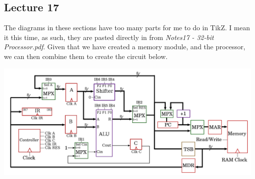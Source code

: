 \documentclass[a4paper, 12pt]{article}
\begin{document}
        \subsection*{Lecture 17}
            The diagrams in these sections have too many parts for me to do in TikZ. I mean it this time, as such, they are pasted directly in from \textit{Notes17 - 32-bit Processor.pdf}. Given that we have created a memory module, and the processor, we can then combine them to create the circuit below.

            \includegraphics[width=\linewidth]{2019-04-11-17-48-25.png}
\end{document}

